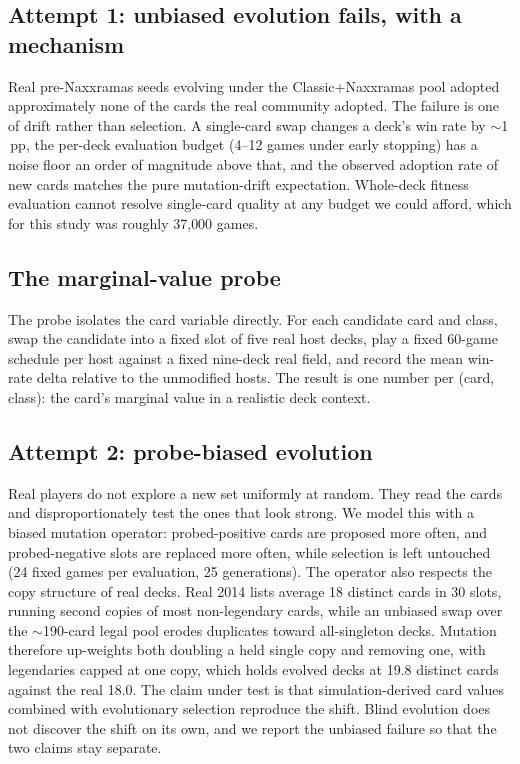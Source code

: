 \documentclass[conference]{IEEEtran}
\newcommand{\pp}{\,\text{pp}}
\begin{document}
\subsection{Attempt 1: unbiased evolution fails, with a mechanism}
Real pre-Naxxramas seeds evolving under the Classic+Naxxramas pool
adopted approximately none of the cards the real community adopted.
The failure is one of drift rather than selection. A single-card
swap changes a deck's win rate by $\sim$1$\pp$, the per-deck
evaluation budget (4--12 games under early stopping) has a noise
floor an order of magnitude above that, and the observed adoption
rate of new cards matches the pure mutation-drift expectation.
Whole-deck fitness evaluation cannot resolve single-card quality at
any budget we could afford, which for this study was roughly
37{,}000 games.

\subsection{The marginal-value probe}
The probe isolates the card variable directly. For each candidate
card and class, swap the candidate into a fixed slot of five real
host decks, play a fixed 60-game schedule per host against a fixed
nine-deck real field, and record the mean win-rate delta relative to
the unmodified hosts. The result is one number per (card, class):
the card's marginal value in a realistic deck context.

\subsection{Attempt 2: probe-biased evolution}
Real players do not explore a new set uniformly at random. They read
the cards and disproportionately test the ones that look strong. We
model this with a biased mutation operator: probed-positive cards
are proposed more often, and probed-negative slots are replaced more
often, while selection is left untouched (24 fixed games per
evaluation, 25 generations). The operator also respects the copy
structure of real decks. Real 2014 lists average 18 distinct cards
in 30 slots, running second copies of most non-legendary cards,
while an unbiased swap over the $\sim$190-card legal pool erodes
duplicates toward all-singleton decks. Mutation therefore up-weights
both doubling a held single copy and removing one, with legendaries
capped at one copy, which holds evolved decks at 19.8 distinct cards
against the real 18.0. The claim under test is that
simulation-derived card values combined with evolutionary selection
reproduce the shift. Blind evolution does not discover the shift on
its own, and we report the unbiased failure so that the two claims
stay separate.
\end{document}
